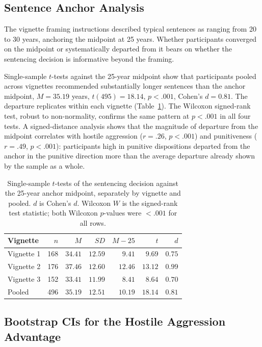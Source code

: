\subsection{Sentence Anchor Analysis}
\label{sec:supp_anchor}

The vignette framing instructions described typical sentences as ranging from 20 to 30 years, anchoring the midpoint at 25 years. Whether participants converged on the midpoint or systematically departed from it bears on whether the sentencing decision is informative beyond the framing.

Single-sample $t$-tests against the 25-year midpoint show that participants pooled across vignettes recommended substantially longer sentences than the anchor midpoint, $M = 35.19$ years, $t(495) = 18.14$, $p < .001$, Cohen's $d = 0.81$. The departure replicates within each vignette (Table~\ref{tab:anchor}). The Wilcoxon signed-rank test, robust to non-normality, confirms the same pattern at $p < .001$ in all four tests. A signed-distance analysis shows that the magnitude of departure from the midpoint correlates with hostile aggression ($r = .26$, $p < .001$) and punitiveness ($r = .49$, $p < .001$): participants high in punitive dispositions departed from the anchor in the punitive direction more than the average departure already shown by the sample as a whole.

\begin{table}[htbp]
  \centering
  \caption{Single-sample $t$-tests of the sentencing decision against the 25-year anchor midpoint, separately by vignette and pooled. $d$ is Cohen's $d$. Wilcoxon $W$ is the signed-rank test statistic; both Wilcoxon $p$-values were $< .001$ for all rows.}
  \label{tab:anchor}
  \small
  \begin{tabular}{lrrrrrr}
    \toprule
    Vignette & $n$ & $M$ & $SD$ & $M - 25$ & $t$ & $d$ \\
    \midrule
    Vignette 1 & 168 & $34.41$ & $12.59$ & $9.41$  & $9.69$  & $0.75$ \\
    Vignette 2 & 176 & $37.46$ & $12.60$ & $12.46$ & $13.12$ & $0.99$ \\
    Vignette 3 & 152 & $33.41$ & $11.99$ & $8.41$  & $8.64$  & $0.70$ \\
    Pooled     & 496 & $35.19$ & $12.51$ & $10.19$ & $18.14$ & $0.81$ \\
    \bottomrule
  \end{tabular}
\end{table}

\subsection{Bootstrap CIs for the Hostile Aggression Advantage}
\label{sec:supp_bootstrap}

